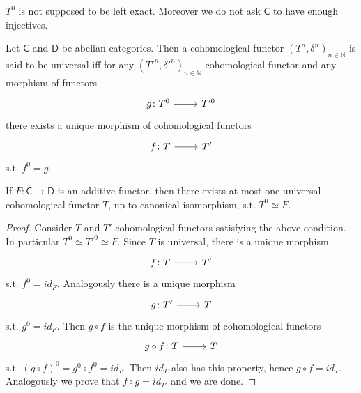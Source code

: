 \documentclass[../Main]{subfiles}
\begin{document}
\begin{rem}[]
	$T^0$ is not supposed to be left exact.
	Moreover we do not ask $\mathsf{C}$ to have enough injectives.
\end{rem}

\begin{defn}
	Let $\mathsf{C}$ and $\mathsf{D}$ be abelian categories.
	Then a cohomological functor $\left(T^n, \delta^n\right)_{n \in \mathbb{N}}$
	is said to be universal iff
	for any $\left(T'^n, \delta'^n\right)_{n \in \mathbb{N}}$
	cohomological functor and
	any morphism of functors
	\begin{equation}
	\begin{tikzcd}
		g\colon T^0 \arrow[r, "", rightarrow] &
		T'^0
	\end{tikzcd}
	\end{equation}
	there exists a unique morphism of cohomological functors
	\begin{equation}
	\begin{tikzcd}
		f\colon T \arrow[r, "", rightarrow] &
		T'
	\end{tikzcd}
	\end{equation}
	s.t. $f^0 = g$.
\end{defn}

\begin{lem}
	If $F\colon \mathsf{C} \to \mathsf{D}$ is an additive functor, then
	there exists at most one universal cohomological functor $T$,
	up to canonical isomorphism,
	s.t. $T^0 \simeq F$.
\end{lem} 
\begin{proof}
	Consider $T$ and $T'$ cohomological functors satisfying the
	above condition.
	In particular $T^0 \simeq T'^0 \simeq F$.
	Since $T$ is universal, there is a unique morphism
	\begin{equation}
	\begin{tikzcd}
		f\colon T \arrow[r, "", rightarrow] &
		T'
	\end{tikzcd}
	\end{equation} 
	s.t. $f^0 = id_F$.
	Analogously there is a unique morphism
	\begin{equation}
	\begin{tikzcd}
		g\colon T' \arrow[r, "", rightarrow] &
		T
	\end{tikzcd}
	\end{equation} 
	s.t. $g^0 = id_F$.
	Then $g \circ f$ is the unique morphism of cohomological functors
	\begin{equation}
	\begin{tikzcd}
		g \circ f\colon T \arrow[r, "", rightarrow] &
		T
	\end{tikzcd}
	\end{equation} 
	s.t. $(g \circ f)^0 = g^0 \circ f^0 = id_F$.
	Then $id_T$ also has this property, hence $g \circ f = id_T$.
	Analogously we prove that $f \circ g = id_{T'}$ and we are done.
\end{proof}
\end{document}

